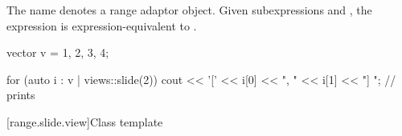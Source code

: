 \pnum
{}%
The name  denotes
a range adaptor object.
Given subexpressions  and ,
the expression  is expression-equivalent to
.
\begin{example}
\begin{codeblock}
vector v = {1, 2, 3, 4};

for (auto i : v | views::slide(2)) {
  cout << '[' << i[0] << ", " << i[1] << "] ";          // prints \tcode{[1, 2] [2, 3] [3, 4]}
}
\end{codeblock}
\end{example}

[range.slide.view]{Class template }

%
%
